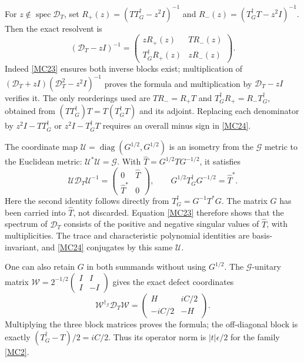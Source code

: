 \documentclass[11pt]{article}
\newcommand{\spec}{\operatorname{spec}}
\newcommand{\adj}{\dagger_G}
\begin{document}
For \(z\notin\spec\mathcal D_T\), set
\(R_+(z)=(TT^\adj-z^2I)^{-1}\) and
\(R_-(z)=(T^\adj T-z^2I)^{-1}\). Then the exact resolvent is
\begin{equation}
 (\mathcal D_T-zI)^{-1}
 =\begin{pmatrix}
 zR_+(z)&T R_-(z)\\
 T^\adj R_+(z)&zR_-(z)
 \end{pmatrix}.
 \tag{MC24}\label{MC24}
\end{equation}
Indeed \eqref{MC23} ensures both inverse blocks exist; multiplication
of \((\mathcal D_T+zI)(\mathcal D_T^2-z^2I)^{-1}\) proves the
formula and multiplication by \(\mathcal D_T-zI\) verifies it.
The only reorderings used are \(TR_-=R_+T\) and
\(T^\adj R_+=R_-T^\adj\), obtained from
\((TT^\adj)T=T(T^\adj T)\) and its adjoint.
Replacing each denominator by \(z^2I-TT^\adj\) or
\(z^2I-T^\adj T\) requires an overall minus sign in \eqref{MC24}.

The coordinate map \(\mathcal U=\operatorname{diag}(G^{1/2},G^{1/2})\)
is an isometry from the \(\mathcal G\) metric to the Euclidean metric:
\(\mathcal U^*\mathcal U=\mathcal G\). With
\(\widehat T=G^{1/2}TG^{-1/2}\), it satisfies
\begin{equation}
 \mathcal U\mathcal D_T\mathcal U^{-1}
  =\begin{pmatrix}0&\widehat T\\\widehat T^*&0\end{pmatrix},
 \qquad
 G^{1/2}T^\adj G^{-1/2}=\widehat T^*.
 \tag{MC25}\label{MC25}
\end{equation}
Here the second identity follows directly from \(T^\adj=G^{-1}T^*G\).
The matrix \(G\) has been carried into \(\widehat T\), not discarded.
Equation \eqref{MC23} therefore shows that the spectrum of
\(\mathcal D_T\) consists of the positive and negative singular values
of \(\widehat T\), with multiplicities. The trace and characteristic
polynomial identities are basis-invariant, and \eqref{MC24} conjugates
by this same \(\mathcal U\).

One can also retain \(G\) in both summands without using \(G^{1/2}\).
The \(\mathcal G\)-unitary matrix
\(\mathcal W=2^{-1/2}\left(\begin{smallmatrix}I&I\\I&-I\end{smallmatrix}\right)\)
gives the exact defect coordinates
\begin{equation}
 \mathcal W^{\dagger_{\mathcal G}}\mathcal D_T\mathcal W
 =\begin{pmatrix}H&iC/2\\-iC/2&-H\end{pmatrix}.
 \tag{MC26}\label{MC26}
\end{equation}
Multiplying the three block matrices proves the formula; the
off-diagonal block is exactly \((T^\adj-T)/2=iC/2\).
Thus its operator norm is \(|t|\epsilon/2\) for the family \eqref{MC2}.
\end{document}
